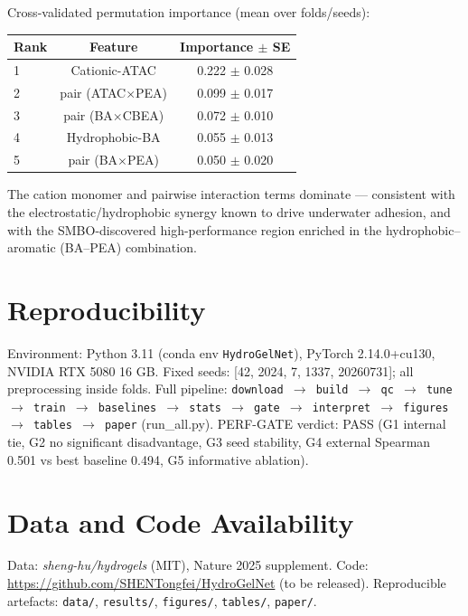\documentclass[utf8]{frontiers_suppmat}
\begin{document}
Cross-validated permutation importance (mean over folds/seeds):
\begin{table}[h]
\centering
\begin{tabular}{lcc}
\toprule
Rank & Feature & Importance $\pm$ SE \\
\midrule
1 & Cationic-ATAC & 0.222 $\pm$ 0.028 \\
2 & pair (ATAC$\times$PEA) & 0.099 $\pm$ 0.017 \\
3 & pair (BA$\times$CBEA) & 0.072 $\pm$ 0.010 \\
4 & Hydrophobic-BA & 0.055 $\pm$ 0.013 \\
5 & pair (BA$\times$PEA) & 0.050 $\pm$ 0.020 \\
\bottomrule
\end{tabular}
\end{table}

The cation monomer and pairwise interaction terms dominate --- consistent
with the electrostatic/hydrophobic synergy known to drive underwater
adhesion, and with the SMBO-discovered high-performance region enriched in
the hydrophobic--aromatic (BA--PEA) combination.

\section{Reproducibility}

Environment: Python 3.11 (conda env \texttt{HydroGelNet}), PyTorch
2.14.0+cu130, NVIDIA RTX 5080 16 GB. Fixed seeds: [42, 2024, 7, 1337,
20260731]; all preprocessing inside folds. Full pipeline:
\texttt{download $\rightarrow$ build $\rightarrow$ qc $\rightarrow$ tune
$\rightarrow$ train $\rightarrow$ baselines $\rightarrow$ stats
$\rightarrow$ gate $\rightarrow$ interpret $\rightarrow$ figures
$\rightarrow$ tables $\rightarrow$ paper} (run\_all.py). PERF-GATE verdict:
PASS (G1 internal tie, G2 no significant disadvantage, G3 seed stability, G4
external Spearman 0.501 vs best baseline 0.494, G5 informative ablation).

\section{Data and Code Availability}

Data: \emph{sheng-hu/hydrogels} (MIT), Nature 2025 supplement. Code:
\url{https://github.com/SHENTongfei/HydroGelNet} (to be released).
Reproducible artefacts: \texttt{data/}, \texttt{results/},
\texttt{figures/}, \texttt{tables/}, \texttt{paper/}.
\end{document}
